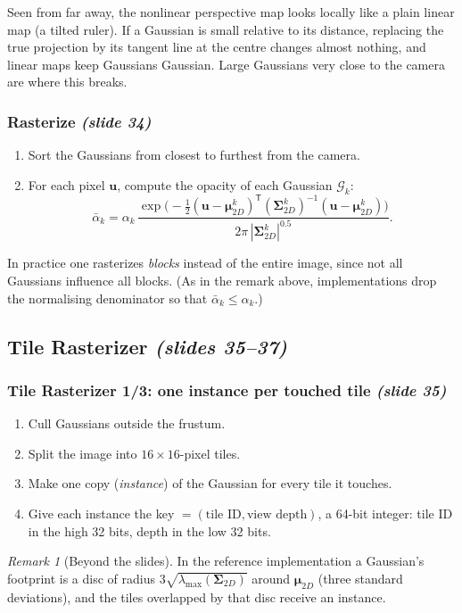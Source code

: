 \documentclass[11pt,a4paper]{article}
\newcommand{\sr}[1]{\texorpdfstring{\emph{(#1)}}{(#1)}}
\newcommand{\T}{^{\mathsf T}}
\newcommand{\G}{\mathcal{G}}
\newcommand{\abar}{\bar\alpha}
\theoremstyle{definition}
\theoremstyle{plain}
\theoremstyle{remark}
\newtheorem{remark}[definition]{Remark}
\begin{document}
\begin{intuition}
Seen from far away, the nonlinear perspective map looks locally like a plain linear map (a tilted ruler). If a Gaussian is small relative to its distance, replacing the true projection by its tangent line at the centre changes almost nothing, and linear maps keep Gaussians Gaussian. Large Gaussians very close to the camera are where this breaks.
\end{intuition}

\subsubsection{Rasterize \sr{slide 34}}
\begin{enumerate}[nosep]
\item Sort the Gaussians from closest to furthest from the camera.
\item For each pixel $\bm u$, compute the opacity of each Gaussian $\G_k$:
\[
\abar_k=\alpha_k\,\frac{\exp\!\big(-\tfrac12(\bm u-\bm\mu^k_{2D})\T(\bm\Sigma^k_{2D})^{-1}(\bm u-\bm\mu^k_{2D})\big)}{2\pi\,|\bm\Sigma^k_{2D}|^{0.5}}.
\]
\end{enumerate}
In practice one rasterizes \emph{blocks} instead of the entire image, since not all Gaussians influence all blocks. (As in the remark above, implementations drop the normalising denominator so that $\abar_k\le\alpha_k$.)

\subsection{Tile Rasterizer \sr{slides 35--37}}
\subsubsection{Tile Rasterizer 1/3: one instance per touched tile \sr{slide 35}}
\begin{enumerate}[nosep]
\item Cull Gaussians outside the frustum.
\item Split the image into $16\times16$-pixel tiles.
\item Make one copy (\emph{instance}) of the Gaussian for every tile it touches.
\item Give each instance the key $=(\text{tile ID},\text{view depth})$, a 64-bit integer: tile ID in the high 32 bits, depth in the low 32 bits.
\end{enumerate}

\begin{remark}[Beyond the slides]
In the reference implementation a Gaussian's footprint is a disc of radius $3\sqrt{\lambda_{\max}(\bm\Sigma_{2D})}$ around $\bm\mu_{2D}$ (three standard deviations), and the tiles overlapped by that disc receive an instance.
\end{remark}
\end{document}
